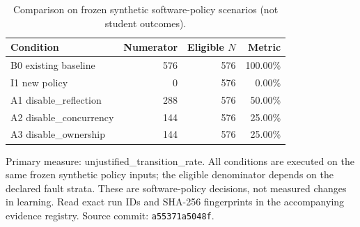 \begin{table}[htbp]
\centering
\small
\caption{Comparison on frozen synthetic software-policy scenarios (not student outcomes).}
\label{tab:ln-10-policy-benchmark}
\begin{tabular}{lrrr}
\toprule
Condition & Numerator & Eligible $N$ & Metric \\
\midrule
B0 existing baseline & 576 & 576 & 100.00\% \\
I1 new policy & 0 & 576 & 0.00\% \\
A1 disable\_reflection & 288 & 576 & 50.00\% \\
A2 disable\_concurrency & 144 & 576 & 25.00\% \\
A3 disable\_ownership & 144 & 576 & 25.00\% \\
\bottomrule
\end{tabular}
\par\smallskip
\begin{minipage}{0.98\linewidth}\footnotesize
Primary measure: unjustified\_transition\_rate. All conditions are executed on the same frozen synthetic policy inputs; the eligible denominator depends on the declared fault strata. These are software-policy decisions, not measured changes in learning. Read exact run IDs and SHA-256 fingerprints in the accompanying evidence registry. Source commit: \texttt{a55371a5048f}.
\end{minipage}
\end{table}
